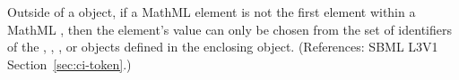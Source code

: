 Outside of a \FunctionDefinition object, if a MathML  element is
not the first element within a MathML , then the 
element's value can only be chosen from the set of identifiers of the
\Species, \Compartment, \Parameter, \SpeciesReference or \Reaction objects
defined in the enclosing \Model object.  (References: SBML L3V1
Section~\ref{sec:ci-token}.)
